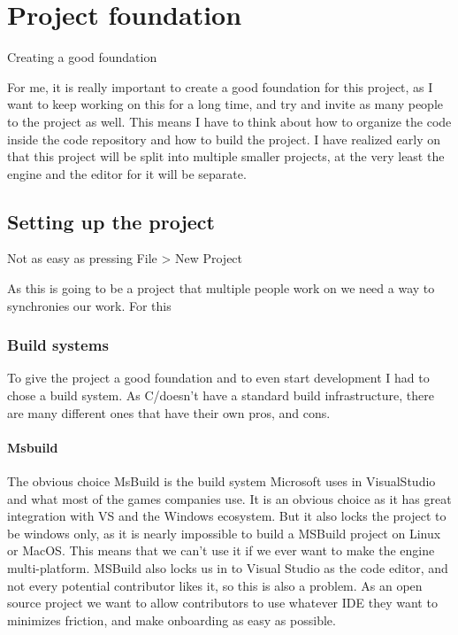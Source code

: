 \chapter{Project foundation}

Creating a good foundation

For me, it is really important to create a good foundation for this project, as I want to keep working on this for a long time, and try and invite as many people to the project as well. This means I have to think about how to organize the code inside the code repository and how to build the project. I have realized early on that this project will be split into multiple smaller projects, at the very least the engine and the editor for it will be separate.

\section{Setting up the project}

Not as easy as pressing File > New Project

As this is going to be a project that multiple people work on we need a way to synchronies our work. For this

\subsection{Build systems}

To give the project a good foundation and to even start development I had to chose a build system. As C/\Cpp doesn't have a standard build infrastructure, there are many different ones that have their own pros, and cons.

\subsubsection{Msbuild}
The obvious choice
MsBuild is the build system Microsoft uses in VisualStudio and what most of the games companies use.
It is an obvious choice as it has great integration with VS and the Windows ecosystem.
But it also locks the project to be windows only, as it is nearly impossible to build a MSBuild \Cpp project on Linux or MacOS.
This means that we can't use it if we ever want to make the engine multi-platform.
MSBuild also locks us in to Visual Studio as the code editor, and not every potential contributor likes it, so this is also a problem.
As an open source project we want to allow contributors to use whatever IDE they want to minimizes friction, and make onboarding as easy as possible.

